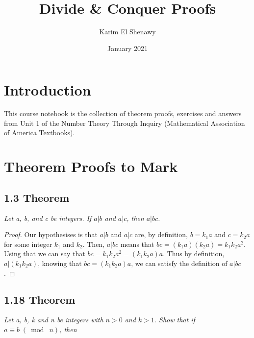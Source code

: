 \documentclass{article}
\title{Divide \& Conquer Proofs}
\author{Karim El Shenawy}
\date{January 2021}
\begin{document}
\maketitle

\section*{Introduction}
This course notebook is the collection of theorem proofs, exercises and answers from Unit 1 of the Number Theory Through Inquiry (Mathematical Association of America Textbooks).

\section*{Theorem Proofs to Mark}

\subsection*{1.3 Theorem} 
\quad \textit{Let a, b, and c be integers. If $a \vert b$ and $a \vert c$, then $a \vert bc$.}

\begin{proof}
Our hypothesises is that $a \vert b$ and $a \vert c$ are, by definition, $b = k_1a$ and $c = k_2a$ for some integer $k_1$ and $k_2$. Then, $a \vert bc$ means that $bc = (k_1a)(k_2a) = k_1k_2a^2$. Using that we can say that $bc = k_1k_2a^2 = (k_1k_2a)a$. Thus by definition, $a \vert (k_1k_2a)$, knowing that $bc= (k_1k_2a)a$, we can satisfy the definition of $a \vert bc$.
\end{proof}

\subsection*{1.18 Theorem} 
\quad \textit{Let a, b, k and n be integers with $n > 0$ and $k > 1$. Show that if $a \equiv b \;(\bmod\; n)$, then}
\end{document}
